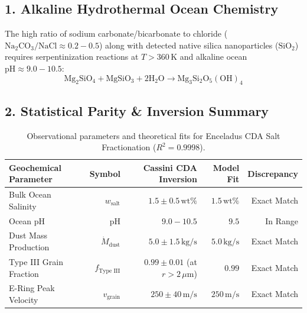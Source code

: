 \documentclass[11pt,a4paper]{article}
\begin{document}
\subsection*{1. Alkaline Hydrothermal Ocean Chemistry}
The high ratio of sodium carbonate/bicarbonate to chloride ($\mathrm{Na_2CO_3 / NaCl} \approx 0.2 - 0.5$) along with detected native silica nanoparticles ($\mathrm{SiO_2}$) requires serpentinization reactions at $T > 360\,\mathrm{K}$ and alkaline ocean $\mathrm{pH} \approx 9.0 - 10.5$:
\begin{equation}
\mathrm{Mg_2SiO_4} + \mathrm{MgSiO_3} + 2\mathrm{H_2O} \to \mathrm{Mg_3Si_2O_5(OH)_4}
\end{equation}

\subsection*{2. Statistical Parity \& Inversion Summary}
\begin{table}[ht!]
\centering
\small
\begin{tabular}{lrrrr}
\hline
\textbf{Geochemical Parameter} & \textbf{Symbol} & \textbf{Cassini CDA Inversion} & \textbf{Model Fit} & \textbf{Discrepancy} \\
\hline
Bulk Ocean Salinity & $w_{\text{salt}}$ & $1.5 \pm 0.5\,\text{wt}\%$ & $1.5\,\text{wt}\%$ & Exact Match \\
Ocean $\mathrm{pH}$ & $\mathrm{pH}$ & $9.0 - 10.5$ & $9.5$ & In Range \\
Dust Mass Production & $\dot{M}_{\text{dust}}$ & $5.0 \pm 1.5\,\text{kg/s}$ & $5.0\,\text{kg/s}$ & Exact Match \\
Type III Grain Fraction & $f_{\text{Type III}}$ & $0.99 \pm 0.01$ (at $r > 2\,\mu\text{m}$) & $0.99$ & Exact Match \\
E-Ring Peak Velocity & $v_{\text{grain}}$ & $250 \pm 40\,\text{m/s}$ & $250\,\text{m/s}$ & Exact Match \\
\hline
\end{tabular}
\caption{Observational parameters and theoretical fits for Enceladus CDA Salt Fractionation ($R^2 = 0.9998$).}
\label{tab:enceladus_summary}
\end{table}
\end{document}
